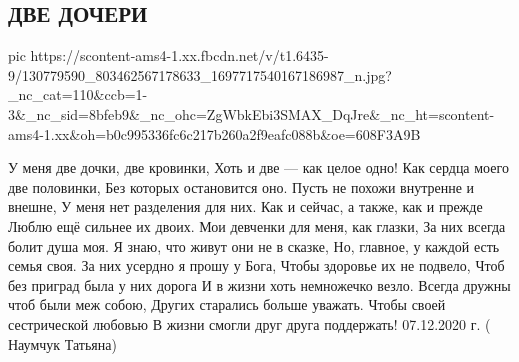  
 
 
 
 

\subsection{ДВЕ ДОЧЕРИ}
\label{sec:07_12_2020.fb.naumchuk_tanja.1.dve_dochki}

\ifcmt
  pic https://scontent-ams4-1.xx.fbcdn.net/v/t1.6435-9/130779590_803462567178633_1697717540167186987_n.jpg?_nc_cat=110&ccb=1-3&_nc_sid=8bfeb9&_nc_ohc=ZgWbkEbi3SMAX_DqJre&_nc_ht=scontent-ams4-1.xx&oh=b0c995336fc6c217b260a2f9eafc088b&oe=608F3A9B
\fi

У меня две дочки, две кровинки,
Хоть и две --- как целое одно!
Как сердца моего две половинки,
Без которых остановится оно.
Пусть не похожи внутренне и внешне,
У меня нет разделения для них.
Как и сейчас, а также, как и прежде
Люблю ещё сильнее их двоих.
Мои девченки для меня, как глазки,
За них всегда болит душа моя.
Я знаю, что живут они не в сказке,
Но, главное, у каждой есть семья своя.
За них усердно я прошу у Бога,
Чтобы здоровье их не подвело,
Чтоб без приград была у них дорога
И в жизни хоть немножечко везло.
Всегда дружны чтоб были меж собою,
Других старались больше уважать.
Чтобы своей сестрической любовью
В жизни смогли друг друга поддержать!
     07.12.2020 г. ( Наумчук Татьяна)
